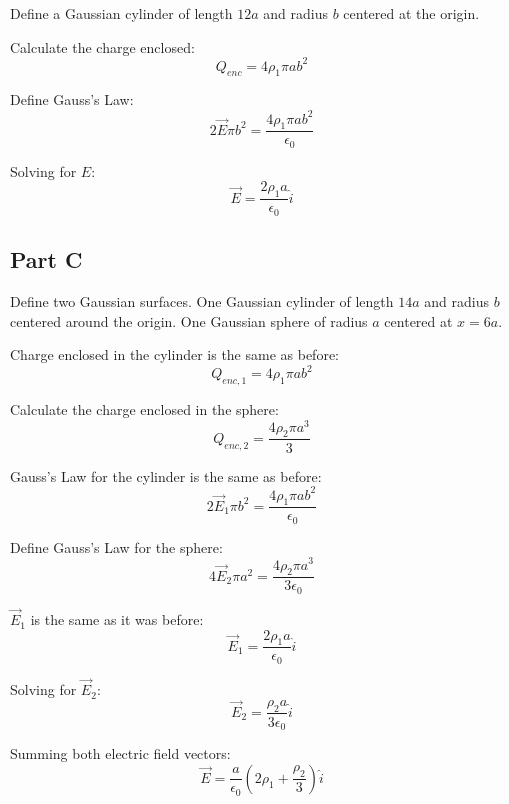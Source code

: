 \documentclass{article}
\begin{document}
Define a Gaussian cylinder of length $12 a$ and radius $b$ centered at the origin.

\bigbreak

Calculate the charge enclosed:
$$ Q_{enc} = 4 \rho_{1} \pi a b^{2} $$

Define Gauss's Law:
$$ 2 \vec{E} \pi b^{2} = \frac{ 4 \rho_{1} \pi a b^{2} }{ \epsilon_0 } $$

Solving for $E$:
$$ \vec{E} = \frac{ 2 \rho_{1} a }{ \epsilon_0 } \hat{i} $$

\subsection*{Part C}

Define two Gaussian surfaces. One Gaussian cylinder of length $14a$ and radius
$b$ centered around the origin. One Gaussian sphere of radius $a$ centered at $x
= 6a$.

\bigbreak

Charge enclosed in the cylinder is the same as before:
$$ Q_{enc, 1} = 4 \rho_{1} \pi a b^{2} $$

Calculate the charge enclosed in the sphere:
$$ Q_{enc, 2} = \frac{ 4 \rho_{2} \pi a^{3} }{ 3 } $$

Gauss's Law for the cylinder is the same as before:
$$ 2 \vec{E}_{1} \pi b^{2} = \frac{ 4 \rho_{1} \pi a b^{2} }{ \epsilon_0 } $$

Define Gauss's Law for the sphere:
$$ 4 \vec{E}_{2} \pi a^{2} = \frac{ 4 \rho_{2} \pi a^{3} }{ 3 \epsilon_0 } $$

$\vec{E}_{1}$ is the same as it was before:
$$ \vec{E}_{1} = \frac{ 2 \rho_{1} a }{ \epsilon_0 } \hat{i} $$

Solving for $\vec{E}_{2}$:
$$ \vec{E}_{2} = \frac{ \rho_{2} a }{ 3 \epsilon_0 } \hat{i} $$

Summing both electric field vectors:
$$ \vec{E} = \frac{ a }{ \epsilon_0 }\left( 2 \rho_{1} + \frac{ \rho_{2} }{ 3 }
\right) \hat{i} $$
\end{document}
